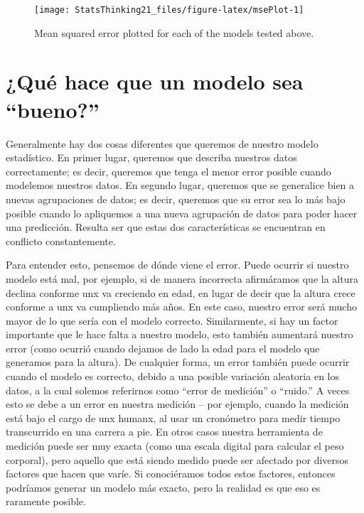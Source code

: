 \documentclass[
  12pt,
]{book}
\theoremstyle{definition}
\theoremstyle{definition}
\theoremstyle{definition}
\theoremstyle{remark}
\begin{document}
\begin{figure}
\texttt{[image: StatsThinking21\_files/figure-latex/msePlot-1]} \caption{Mean squared error plotted for each of the models tested above.}\label{fig:msePlot}
\end{figure}

\hypertarget{quuxe9-hace-que-un-modelo-sea-bueno}{%
\section{¿Qué hace que un modelo sea ``bueno?''}\label{quuxe9-hace-que-un-modelo-sea-bueno}}

Generalmente hay dos cosas diferentes que queremos de nuestro modelo estadístico. En primer lugar, queremos que describa nuestros datos correctamente; es decir, queremos que tenga el menor error posible cuando modelemos nuestros datos. En segundo lugar, queremos que se generalice bien a nuevas agrupaciones de datos; es decir, queremos que su error sea lo más bajo posible cuando lo apliquemos a una nueva agrupación de datos para poder hacer una predicción. Resulta ser que estas dos características se encuentran en conflicto constantemente.

Para entender esto, pensemos de dónde viene el error. Puede ocurrir si nuestro modelo está mal, por ejemplo, si de manera incorrecta afirmáramos que la altura declina conforme unx va creciendo en edad, en lugar de decir que la altura crece conforme a unx va cumpliendo más años. En este caso, nuestro error será mucho mayor de lo que sería con el modelo correcto. Similarmente, si hay un factor importante que le hace falta a nuestro modelo, esto también aumentará nuestro error (como ocurrió cuando dejamos de lado la edad para el modelo que generamos para la altura). De cualquier forma, un error también puede ocurrir cuando el modelo es correcto, debido a una posible variación aleatoria en los datos, a la cual solemos referirnos como ``error de medición'' o ``ruido.'' A veces esto se debe a un error en nuestra medición -- por ejemplo, cuando la medición está bajo el cargo de unx humanx, al usar un cronómetro para medir tiempo transcurrido en una carrera a pie. En otros casos nuestra herramienta de medición puede ser muy exacta (como una escala digital para calcular el peso corporal), pero aquello que está siendo medido puede ser afectado por diversos factores que hacen que varíe. Si conociéramos todos estos factores, entonces podríamos generar un modelo más exacto, pero la realidad es que eso es raramente posible.
\end{document}
